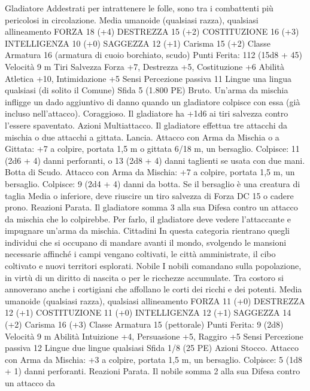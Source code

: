 \begin{multicols}{2}
Gladiatore
Addestrati per intrattenere le folle, sono tra i
combattenti più pericolosi in circolazione.
Media umanoide (qualsiasi razza), qualsiasi allineamento
FORZA 18 (+4)
DESTREZZA 15 (+2)
COSTITUZIONE 16 (+3)
INTELLIGENZA 10 (+0)
SAGGEZZA 12 (+1)
Carisma 15 (+2)
Classe Armatura 16 (armatura di cuoio borchiato, scudo)
\hspace*{0pt}\hfill{Punti Ferita}: 112 (15d8 + 45)
Velocità 9 m
Tiri Salvezza Forza +7, Destrezza +5, Costituzione +6
Abilità Atletica +10, Intimidazione +5
Sensi Percezione passiva 11
Lingue una lingua qualsiasi (di solito il Comune)
Sfida 5 (1.800 PE)
Bruto. Un’arma da mischia infligge un dado aggiuntivo di danno
quando un gladiatore colpisce con essa (già incluso nell’attacco).
Coraggioso. Il gladiatore ha +1d6 ai tiri salvezza contro
l’essere spaventato.
Azioni
Multiattacco. Il gladiatore effettua tre attacchi da mischia o due
attacchi a gittata.
Lancia. Attacco con Arma da Mischia o a Gittata: +7 a colpire,
portata 1,5 m o gittata 6/18 m, un bersaglio.
Colpisce: 11 (2d6 + 4) danni perforanti, o 13 (2d8 + 4) danni
taglienti se usata con due mani.
Botta di Scudo. Attacco con Arma da Mischia: +7 a colpire,
portata 1,5 m, un bersaglio.
Colpisce: 9 (2d4 + 4) danni da botta. Se il bersaglio è una
creatura di taglia Media o inferiore, deve riuscire un tiro salvezza
di Forza DC 15 o cadere prono.
Reazioni
Parata. Il gladiatore somma 3 alla sua Difesa contro un attacco da
mischia che lo colpirebbe. Per farlo, il gladiatore deve vedere
l’attaccante e impugnare un’arma da mischia.
Cittadini
In questa categoria rientrano quegli individui che si
occupano di mandare avanti il mondo, svolgendo le
mansioni necessarie affinché i campi vengano coltivati,
le città amministrate, il cibo coltivato e nuovi territori
esplorati.
Nobile
I nobili comandano sulla popolazione, in virtù di un
diritto di nascita o per le ricchezze accumulate. Tra
costoro si annoverano anche i cortigiani che affollano le
corti dei ricchi e dei potenti.
Media umanoide (qualsiasi razza), qualsiasi allineamento
FORZA 11 (+0)
DESTREZZA 12 (+1)
COSTITUZIONE 11 (+0)
INTELLIGENZA 12 (+1)
SAGGEZZA 14 (+2)
Carisma 16 (+3)
Classe Armatura 15 (pettorale)
\hspace*{0pt}\hfill{Punti Ferita}: 9 (2d8)
Velocità 9 m
Abilità Intuizione +4, Persuasione +5, Raggiro +5
Sensi Percezione passiva 12
Lingue due lingue qualsiasi
Sfida 1/8 (25 PE)
Azioni
Stocco. Attacco con Arma da Mischia: +3 a colpire, portata 1,5
m, un bersaglio.
Colpisce: 5 (1d8 + 1) danni perforanti.
Reazioni
Parata. Il nobile somma 2 alla sua Difesa contro un attacco da

\end{multicols}
